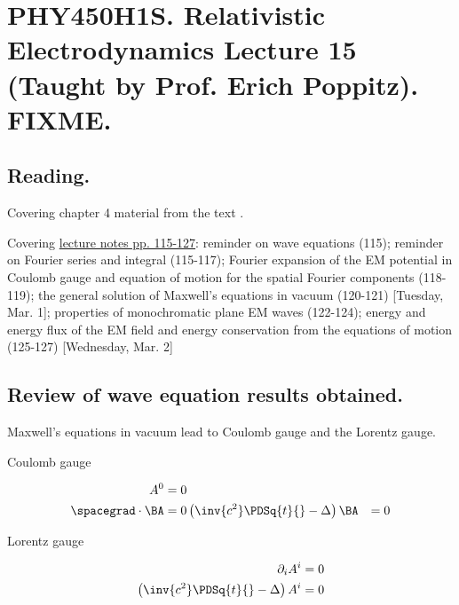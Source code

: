 
%

\chapter{PHY450H1S.  Relativistic Electrodynamics Lecture 15 (Taught by Prof. Erich Poppitz).  FIXME.}
\label{chap:relativisticElectrodynamicsL15}
{}
\date{Feb 16, 2011}

\beginArtNoToc

\section{Reading.}

Covering chapter 4 material from the text \cite{landau1980classical}.

Covering \href{http://www.physics.utoronto.ca/~poppitz/e-poppitz/PHY450_files/RelEMpp115-127.pdf}{lecture notes pp. 115-127}: reminder on wave equations (115); reminder on Fourier series and integral (115-117); Fourier expansion of the EM potential in Coulomb gauge and equation of motion for the spatial Fourier components (118-119); the general solution of Maxwell's equations in vacuum (120-121) [Tuesday, Mar. 1]; properties of monochromatic plane EM waves (122-124); energy and energy flux of the EM field and energy conservation from the equations of motion (125-127)  [Wednesday, Mar. 2]

\section{Review of wave equation results obtained.}

Maxwell's equations in vacuum lead to Coulomb gauge and the Lorentz gauge.

Coulomb gauge

\begin{align}\label{eqn:relativisticElectrodynamicsL15:n}
A^0 &= 0 \\
\spacegrad \cdot \BA &= 0
\left( \inv{c^2} \PDSq{t}{} - \Delta \right) \BA &= 0
\end{align}

Lorentz gauge

\begin{align}\label{eqn:relativisticElectrodynamicsL15:n}
\partial_i A^i &= 0 \\
\left( \inv{c^2} \PDSq{t}{} - \Delta \right) A^i &= 0
\end{align}

